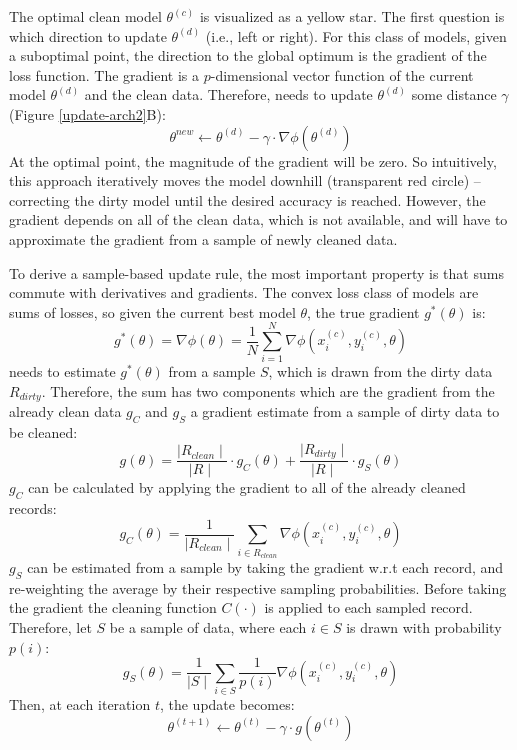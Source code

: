 The optimal clean model $\theta^{(c)}$ is visualized as a yellow star.
The first question is which direction to update $\theta^{(d)}$ (i.e., left or right).
For this class of models, given a suboptimal point, the direction to 
the global optimum is the gradient of the loss function.
The gradient is a $p$-dimensional vector function of the current model $\theta^{(d)}$ and the clean data.
Therefore, \sys needs to update $\theta^{(d)}$ some distance $\gamma$ (Figure \ref{update-arch2}B):
\[
\theta^{new} \leftarrow \theta^{(d)} - \gamma \cdot \nabla\phi(\theta^{(d)})
\]
At the optimal point, the magnitude of the gradient will be zero.
So intuitively, this approach iteratively moves the model downhill (transparent red circle) -- correcting the dirty model until the desired accuracy is reached.
However, the gradient depends on all of the clean data, which is not available, and \sys will have to approximate the gradient from a sample of newly cleaned data.

To derive a sample-based update rule, the most important property is that sums commute with derivatives and gradients.
The convex loss class of models are sums of losses, so given the current best model $\theta$, the true gradient $g^*(\theta)$ is:
\[
g^*(\theta) = \nabla\phi(\theta) = \frac{1}{N} \sum_{i=1}^N \nabla\phi(x_i^{(c)},y_i^{(c)},\theta)
\]
\sys needs to estimate $g^*(\theta)$ from a sample $S$, which is drawn from the dirty data $R_{dirty}$.
 Therefore, the sum has two components which are the gradient from the already clean data $g_C$ and $g_S$ a gradient estimate from a sample of dirty data to be cleaned:
\begin{equation}
g(\theta) = \frac{\mid R_{clean} \mid}{\mid R \mid} \cdot g_C(\theta) + \frac{\mid R_{dirty} \mid}{\mid R \mid} \cdot g_S(\theta)\label{unbia}
\end{equation}
$g_C$ can be calculated by applying the gradient to all of the already cleaned records:
\[
g_C(\theta) = \frac{1}{\mid R_{clean}\mid}\sum_{i \in R_{clean}}\nabla\phi(x_i^{(c)},y_i^{(c)},\theta)
\] 
$g_S$ can be estimated from a sample by taking the gradient w.r.t each record, and re-weighting the average by their respective sampling probabilities.
Before taking the gradient the cleaning function $C(\cdot)$ is applied to each sampled record.
Therefore, let $S$ be a sample of data, where each $i \in S$ is drawn with probability $p(i)$:
\[
g_{S}(\theta) = \frac{1}{\mid S \mid} \sum_{i \in S}\frac{1}{p(i)}\nabla\phi(x_i^{(c)},y_i^{(c)},\theta)
\]
Then, at each iteration $t$, the update becomes:
\[
\theta^{(t+1)} \leftarrow \theta^{(t)} - \gamma \cdot g(\theta^{(t)})
\]

